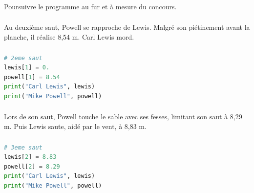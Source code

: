 \documentclass[svgnames,11pt]{beamer}
\begin{document}
\begin{frame}
    \frametitle{}

    \begin{activite}
        Poursuivre le programme au fur et à mesure du concours.
    \end{activite}

\end{frame}
\begin{frame}
    \frametitle{}

    Au deuxième saut, Powell se rapproche de Lewis. Malgré son piétinement avant la planche, il réalise 8,54 m. Carl Lewis mord.

\end{frame}
\begin{frame}[fragile]
    \frametitle{}

    \begin{lstlisting}[language=Python , basicstyle=\ttfamily\small, xleftmargin=2em, xrightmargin=2em]
# 2eme saut
lewis[1] = 0.
powell[1] = 8.54
print("Carl Lewis", lewis)
print("Mike Powell", powell)
\end{lstlisting}

\end{frame}

\begin{frame}
    \frametitle{}

    Lors de son saut, Powell touche le sable avec ses fesses, limitant son saut à 8,29 m. Puis Lewis saute, aidé par le vent, à 8,83 m.

\end{frame}
\begin{frame}[fragile]
    \frametitle{}

    \begin{lstlisting}[language=Python , basicstyle=\ttfamily\small, xleftmargin=2em, xrightmargin=2em]
# 3eme saut
lewis[2] = 8.83
powell[2] = 8.29
print("Carl Lewis", lewis)
print("Mike Powell", powell)
\end{lstlisting}

\end{frame}
\end{document}

